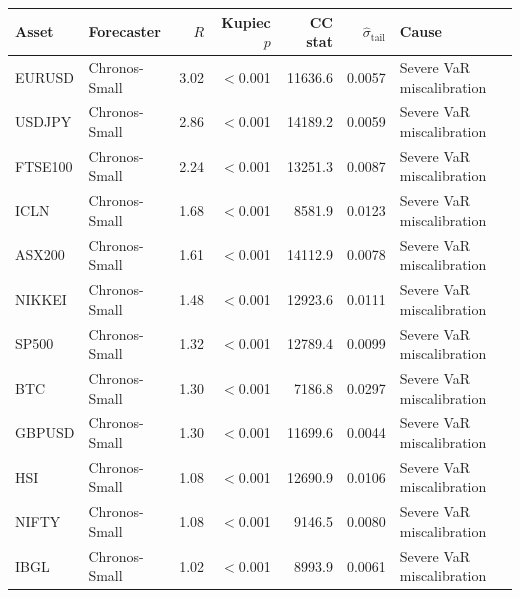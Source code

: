 \begin{tabular}{llrrrrl}
\toprule
Asset & Forecaster & $R$ & Kupiec $p$ & CC stat & $\hat{\sigma}_{\mathrm{tail}}$ & Cause \\
\midrule
  EURUSD & Chronos-Small & 3.02 & $<$0.001 & 11636.6 & 0.0057 & Severe VaR miscalibration \\
  USDJPY & Chronos-Small & 2.86 & $<$0.001 & 14189.2 & 0.0059 & Severe VaR miscalibration \\
  FTSE100 & Chronos-Small & 2.24 & $<$0.001 & 13251.3 & 0.0087 & Severe VaR miscalibration \\
  ICLN & Chronos-Small & 1.68 & $<$0.001 & 8581.9 & 0.0123 & Severe VaR miscalibration \\
  ASX200 & Chronos-Small & 1.61 & $<$0.001 & 14112.9 & 0.0078 & Severe VaR miscalibration \\
  NIKKEI & Chronos-Small & 1.48 & $<$0.001 & 12923.6 & 0.0111 & Severe VaR miscalibration \\
  SP500 & Chronos-Small & 1.32 & $<$0.001 & 12789.4 & 0.0099 & Severe VaR miscalibration \\
  BTC & Chronos-Small & 1.30 & $<$0.001 & 7186.8 & 0.0297 & Severe VaR miscalibration \\
  GBPUSD & Chronos-Small & 1.30 & $<$0.001 & 11699.6 & 0.0044 & Severe VaR miscalibration \\
  HSI & Chronos-Small & 1.08 & $<$0.001 & 12690.9 & 0.0106 & Severe VaR miscalibration \\
  NIFTY & Chronos-Small & 1.08 & $<$0.001 & 9146.5 & 0.0080 & Severe VaR miscalibration \\
  IBGL & Chronos-Small & 1.02 & $<$0.001 & 8993.9 & 0.0061 & Severe VaR miscalibration \\
\bottomrule
\end{tabular}